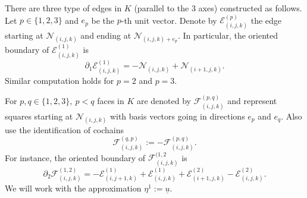 \begin{example}
  There are three type of edges in $K$ (parallel to the $3$ axes)
  constructed as follows.
  Let $p \in \{1, 2, 3\}$ and $e_p$ be the $p$-th unit vector.
  Denote by $\mathcal{E}^{(p)}_{(i, j, k)}$ the edge starting at
  $\mathcal{N}_{(i, j, k)}$ and ending at $\mathcal{N}_{(i, j, k) + e_p}$.
  In particular, the oriented boundary of $\mathcal{E}^{(1)}_{(i, j, k)}$ is
  \begin{equation}
    \partial_1 \mathcal{E}^{(1)}_{(i, j, k)} =
    - \mathcal{N}_{(i, j, k)} + \mathcal{N}_{(i + 1, j, k)}.
  \end{equation}
  Similar computation holds for $p = 2$ and $p = 3$.

  For $p, q \in \{1, 2, 3\},\ p < q$ faces in $K$ are denoted by
  $\mathcal{F}^{(p, q)}_{(i, j, k)}$ and represent squares starting at
  $\mathcal{N}_{(i, j, k)}$ with basis vectors going in directions
  $e_p$ and $e_q$.
  Also use the identification of cochains
  \begin{equation}
    \mathcal{F}^{(q, p)}_{(i, j, k)} := -\mathcal{F}^{(p, q)}_{(i, j, k)}.
  \end{equation}
  For instance, the oriented boundary of $\mathcal{F}^{(1, 2}_{(i, j, k)}$ is
  \begin{equation}
    \partial_2 \mathcal{F}^{(1, 2)}_{(i, j, k)} =
    - \mathcal{E}^{(1)}_{(i, j + 1, k)}
    + \mathcal{E}^{(1)}_{(i, j, k)}
    + \mathcal{E}^{(2)}_{(i + 1, j, k)}
    - \mathcal{E}^{(2)}_{(i, j, k)}.
  \end{equation}
  We will work with the approximation $\eta^1 := \underline{u}$.


\end{example}
